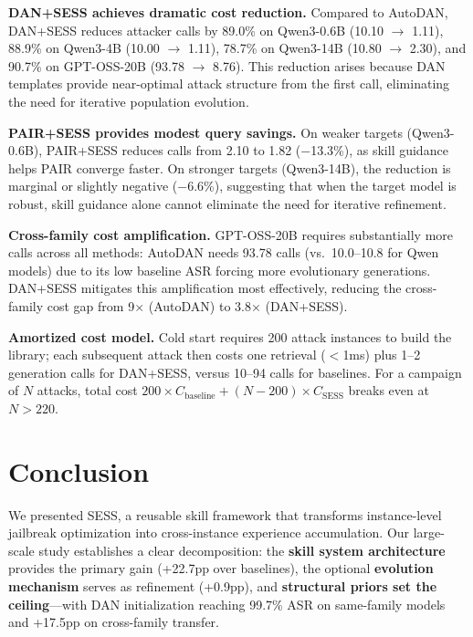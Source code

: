 \documentclass{article} %
\begin{document}
\textbf{DAN+SESS achieves dramatic cost reduction.} Compared to AutoDAN, DAN+SESS reduces attacker calls by 89.0\% on Qwen3-0.6B (10.10 $\to$ 1.11), 88.9\% on Qwen3-4B (10.00 $\to$ 1.11), 78.7\% on Qwen3-14B (10.80 $\to$ 2.30), and 90.7\% on GPT-OSS-20B (93.78 $\to$ 8.76). This reduction arises because DAN templates provide near-optimal attack structure from the first call, eliminating the need for iterative population evolution.

\textbf{PAIR+SESS provides modest query savings.} On weaker targets (Qwen3-0.6B), PAIR+SESS reduces calls from 2.10 to 1.82 ($-$13.3\%), as skill guidance helps PAIR converge faster. On stronger targets (Qwen3-14B), the reduction is marginal or slightly negative ($-$6.6\%), suggesting that when the target model is robust, skill guidance alone cannot eliminate the need for iterative refinement.

\textbf{Cross-family cost amplification.} GPT-OSS-20B requires substantially more calls across all methods: AutoDAN needs 93.78 calls (vs.\ 10.0--10.8 for Qwen models) due to its low baseline ASR forcing more evolutionary generations. DAN+SESS mitigates this amplification most effectively, reducing the cross-family cost gap from 9$\times$ (AutoDAN) to 3.8$\times$ (DAN+SESS).

\textbf{Amortized cost model.} Cold start requires 200 attack instances to build the library; each subsequent attack then costs one retrieval ($<$1ms) plus 1--2 generation calls for DAN+SESS, versus 10--94 calls for baselines. For a campaign of $N$ attacks, total cost $200 \times C_{\text{baseline}} + (N - 200) \times C_{\text{SESS}}$ breaks even at $N > 220$.

\section{Conclusion}

We presented SESS, a reusable skill framework that transforms instance-level jailbreak optimization into cross-instance experience accumulation. Our large-scale study establishes a clear decomposition: the \textbf{skill system architecture} provides the primary gain (+22.7pp over baselines), the optional \textbf{evolution mechanism} serves as refinement (+0.9pp), and \textbf{structural priors set the ceiling}---with DAN initialization reaching 99.7\% ASR on same-family models and +17.5pp on cross-family transfer.
\end{document}
